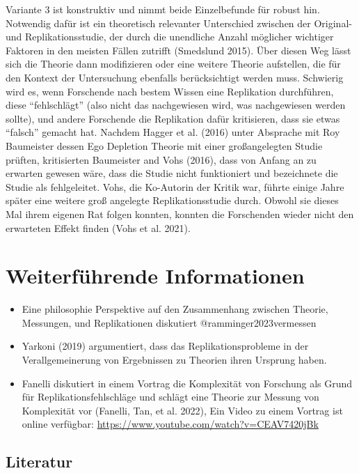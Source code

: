 \documentclass[
  letterpaper,
  DIV=11,
  numbers=noendperiod]{scrreprt}
\begin{document}
Variante 3 ist konstruktiv und nimmt beide Einzelbefunde für robust hin.
Notwendig dafür ist ein theoretisch relevanter Unterschied zwischen der
Original- und Replikationsstudie, der durch die unendliche Anzahl
möglicher wichtiger Faktoren in den meisten Fällen zutrifft (Smedslund
2015). Über diesen Weg lässt sich die Theorie dann modifizieren oder
eine weitere Theorie aufstellen, die für den Kontext der Untersuchung
ebenfalls berücksichtigt werden muss. Schwierig wird es, wenn Forschende
nach bestem Wissen eine Replikation durchführen, diese ``fehlschlägt''
(also nicht das nachgewiesen wird, was nachgewiesen werden sollte), und
andere Forschende die Replikation dafür kritisieren, dass sie etwas
``falsch'' gemacht hat. Nachdem Hagger et al. (2016) unter Absprache mit
Roy Baumeister dessen Ego Depletion Theorie mit einer großangelegten
Studie prüften, kritisierten Baumeister and Vohs (2016), dass von Anfang
an zu erwarten gewesen wäre, dass die Studie nicht funktioniert und
bezeichnete die Studie als fehlgeleitet. Vohs, die Ko-Autorin der Kritik
war, führte einige Jahre später eine weitere groß angelegte
Replikationsstudie durch. Obwohl sie dieses Mal ihrem eigenen Rat folgen
konnten, konnten die Forschenden wieder nicht den erwarteten Effekt
finden (Vohs et al. 2021).

\section{Weiterführende
Informationen}\label{weiterfuxfchrende-informationen-1}

\begin{itemize}
\item
  Eine philosophie Perspektive auf den Zusammenhang zwischen Theorie,
  Messungen, und Replikationen diskutiert @ramminger2023vermessen
\item
  Yarkoni (2019) argumentiert, dass das Replikationsprobleme in der
  Verallgemeinerung von Ergebnissen zu Theorien ihren Ursprung haben.
\item
  Fanelli diskutiert in einem Vortrag die Komplexität von Forschung als
  Grund für Replikationsfehlschläge und schlägt eine Theorie zur Messung
  von Komplexität vor (Fanelli, Tan, et al. 2022), Ein Video zu einem
  Vortrag ist online verfügbar:
  \url{https://www.youtube.com/watch?v=CEAV7420jBk}
\end{itemize}

\subsection{Literatur}\label{literatur-11}
\end{document}
